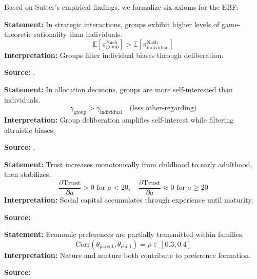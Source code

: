 Based on Sutter's empirical findings, we formalize six axioms for the EBF:

\begin{tcolorbox}[colback=gray!5!white, colframe=gray!75!black,
    title=Axiom UNMAPPED_SU-1: Group Rationality Premium]
\textbf{Statement:} In strategic interactions, groups exhibit higher levels of game-theoretic rationality than individuals.
\begin{equation}
\mathbb{E}[\pi_{\text{group}}^{\text{Nash}}] > \mathbb{E}[\pi_{\text{individual}}^{\text{Nash}}]
\end{equation}
\textbf{Interpretation:} Groups filter individual biases through deliberation.

\textbf{Source:} \citet{charness2012groups}, \citet{kocher2005decision}
\end{tcolorbox}

\begin{tcolorbox}[colback=gray!5!white, colframe=gray!75!black,
    title=Axiom UNMAPPED_SU-2: Group Selfishness Premium]
\textbf{Statement:} In allocation decisions, groups are more self-interested than individuals.
\begin{equation}
\gamma_{\text{group}} > \gamma_{\text{individual}} \quad \text{(less other-regarding)}
\end{equation}
\textbf{Interpretation:} Group deliberation amplifies self-interest while filtering altruistic biases.

\textbf{Source:} \citet{luhan2009polarization}, \citet{kugler2007trust}
\end{tcolorbox}

\begin{tcolorbox}[colback=gray!5!white, colframe=gray!75!black,
    title=Axiom UNMAPPED_SU-3: Trust Development]
\textbf{Statement:} Trust increases monotonically from childhood to early adulthood, then stabilizes.
\begin{equation}
\frac{\partial \text{Trust}}{\partial a} > 0 \text{ for } a < 20, \quad \frac{\partial \text{Trust}}{\partial a} \approx 0 \text{ for } a \geq 20
\end{equation}
\textbf{Interpretation:} Social capital accumulates through experience until maturity.

\textbf{Source:} \citet{sutter2007trust}
\end{tcolorbox}

\begin{tcolorbox}[colback=gray!5!white, colframe=gray!75!black,
    title=Axiom UNMAPPED_SU-4: Preference Heritability]
\textbf{Statement:} Economic preferences are partially transmitted within families.
\begin{equation}
\text{Corr}(\theta_{\text{parent}}, \theta_{\text{child}}) = \rho \in [0.3, 0.4]
\end{equation}
\textbf{Interpretation:} Nature and nurture both contribute to preference formation.

\textbf{Source:} \citet{chowdhury2022preferences}
\end{tcolorbox}

